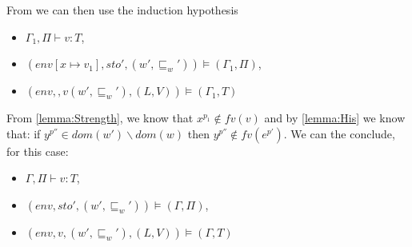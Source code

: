 	From   we can then use the induction hypothesis
	\begin{itemize}
		\item $\Gamma_1,\Pi\vdash v:T$,
		\item $(env[x\mapsto v_1],sto',(w',\sqsubseteq_w'))\models(\Gamma_1,\Pi)$,
		\item $(env,,v(w',\sqsubseteq_w'),(L,V))\models(\Gamma_1,T)$
	\end{itemize}
	From \cref{lemma:Strength}, we know that $x^{p_1}\notin fv(v)$ and by \cref{lemma:His} we know that: if $y^{p''}\in dom(w')\backslash dom(w)$ then $y^{p''}\notin fv(e^{p'})$.
	We can the conclude, for this case:
	\begin{itemize}
		\item $\Gamma,\Pi\vdash v:T$,
		\item $(env,sto',(w',\sqsubseteq_w'))\models(\Gamma,\Pi)$,
		\item $(env,v,(w',\sqsubseteq_w'),(L,V))\models(\Gamma,T)$
	\end{itemize}
